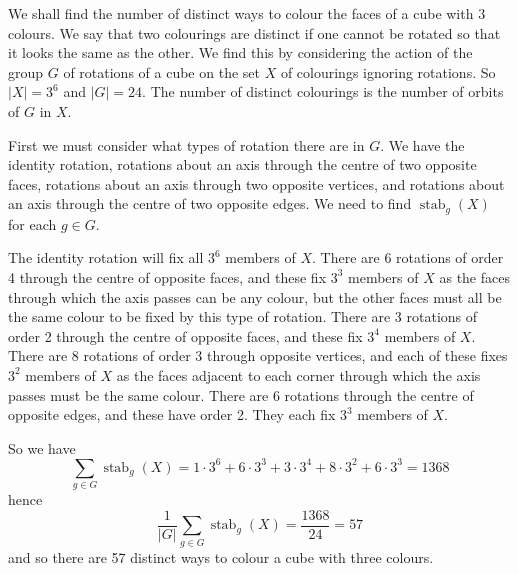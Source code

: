 \documentclass[12pt]{article}
\begin{document}
We shall find the number of distinct ways to colour the faces of a cube with 3 colours. We say that two colourings are distinct if one cannot be rotated so that it looks the same as the other. We find this by considering the action of the group $G$ of rotations of a cube on the set $X$ of colourings ignoring rotations. So $|X|=3^6$ and $|G|=24$. The number of distinct colourings is the number of orbits of $G$ in $X$.

First we must consider what types of rotation there are in $G$. We have the identity rotation, rotations about an axis through the centre of two opposite faces, rotations about an axis through two opposite vertices, and rotations about an axis through the centre of two opposite edges. We need to find $\operatorname{stab}_g(X)$ for each $g\in G$.

The identity rotation will fix all $3^6$ members of $X$. There are 6 rotations of order 4 through the centre of opposite faces, and these fix $3^3$ members of $X$ as the faces through which the axis passes can be any colour, but the other faces must all be the same colour to be fixed by this type of rotation. There are 3 rotations of order 2 through the centre of opposite faces, and these fix $3^4$ members of $X$. There are 8 rotations of order 3 through opposite vertices, and each of these fixes $3^2$ members of $X$ as the faces adjacent to each corner through which the axis passes must be the same colour. There are 6 rotations through the centre of opposite edges, and these have order 2. They each fix $3^3$ members of $X$.

So we have
\[
\sum_{g\in G}\operatorname{stab}_g(X) = 1\cdot 3^6 + 6\cdot 3^3 + 3\cdot 3^4 + 8\cdot 3^2 + 6\cdot 3^3 = 1368
\]
hence
\[
\frac{1}{|G|}\sum_{g\in G}\operatorname{stab}_g(X) = \frac{1368}{24} = 57
\]
and so there are 57 distinct ways to colour a cube with three colours.
\end{document}
